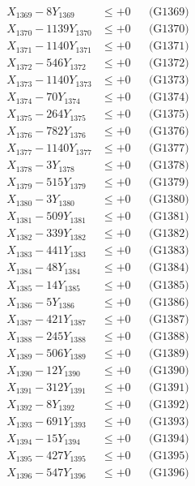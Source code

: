 \documentclass[a4paper,10pt]{article}
\begin{document}
{\begin{align}
X_{1369} - 8Y_{1369} &\leq +0 && \text{(G1369)} \\
X_{1370} - 1139Y_{1370} &\leq +0 && \text{(G1370)} \\
\allowbreak
X_{1371} - 1140Y_{1371} &\leq +0 && \text{(G1371)} \\
X_{1372} - 546Y_{1372} &\leq +0 && \text{(G1372)} \\
X_{1373} - 1140Y_{1373} &\leq +0 && \text{(G1373)} \\
X_{1374} - 70Y_{1374} &\leq +0 && \text{(G1374)} \\
X_{1375} - 264Y_{1375} &\leq +0 && \text{(G1375)} \\
X_{1376} - 782Y_{1376} &\leq +0 && \text{(G1376)} \\
X_{1377} - 1140Y_{1377} &\leq +0 && \text{(G1377)} \\
X_{1378} - 3Y_{1378} &\leq +0 && \text{(G1378)} \\
X_{1379} - 515Y_{1379} &\leq +0 && \text{(G1379)} \\
X_{1380} - 3Y_{1380} &\leq +0 && \text{(G1380)} \\
\allowbreak
X_{1381} - 509Y_{1381} &\leq +0 && \text{(G1381)} \\
X_{1382} - 339Y_{1382} &\leq +0 && \text{(G1382)} \\
X_{1383} - 441Y_{1383} &\leq +0 && \text{(G1383)} \\
X_{1384} - 48Y_{1384} &\leq +0 && \text{(G1384)} \\
X_{1385} - 14Y_{1385} &\leq +0 && \text{(G1385)} \\
X_{1386} - 5Y_{1386} &\leq +0 && \text{(G1386)} \\
X_{1387} - 421Y_{1387} &\leq +0 && \text{(G1387)} \\
X_{1388} - 245Y_{1388} &\leq +0 && \text{(G1388)} \\
X_{1389} - 506Y_{1389} &\leq +0 && \text{(G1389)} \\
X_{1390} - 12Y_{1390} &\leq +0 && \text{(G1390)} \\
\allowbreak
X_{1391} - 312Y_{1391} &\leq +0 && \text{(G1391)} \\
X_{1392} - 8Y_{1392} &\leq +0 && \text{(G1392)} \\
X_{1393} - 691Y_{1393} &\leq +0 && \text{(G1393)} \\
X_{1394} - 15Y_{1394} &\leq +0 && \text{(G1394)} \\
X_{1395} - 427Y_{1395} &\leq +0 && \text{(G1395)} \\
X_{1396} - 547Y_{1396} &\leq +0 && \text{(G1396)} \\

\end{align}}
\end{document}

